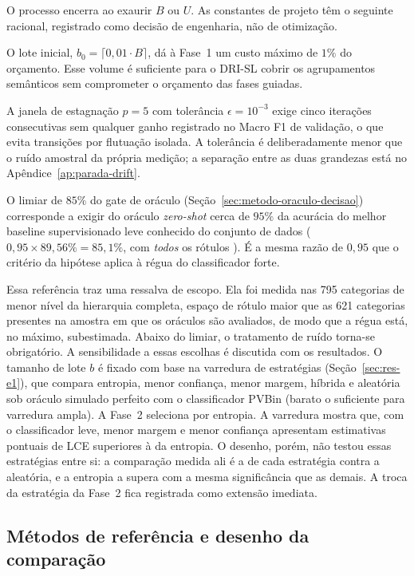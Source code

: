 O processo encerra ao exaurir $B$ ou $U$. As constantes de projeto têm o
seguinte racional, registrado como decisão de engenharia, não de otimização.

O lote inicial, $b_0 = \lceil 0{,}01 \cdot B\rceil$, dá à Fase~1 um custo
máximo de $1\%$ do orçamento. Esse volume é suficiente para o DRI-SL cobrir
os agrupamentos semânticos sem comprometer o orçamento das fases guiadas.

A janela de estagnação $p=5$ com tolerância $\epsilon=10^{-3}$ exige cinco
iterações consecutivas sem qualquer ganho registrado no Macro F1 de validação,
o que evita transições por flutuação isolada. A tolerância é deliberadamente
menor que o ruído amostral da própria medição; a separação entre as duas
grandezas está no Apêndice~\ref{ap:parada-drift}.

O limiar de $85\%$ do gate de oráculo
(Seção~\ref{sec:metodo-oraculo-decisao}) corresponde a exigir do oráculo
\textit{zero-shot} cerca de $95\%$ da acurácia do melhor baseline
supervisionado leve conhecido do conjunto de dados ($0{,}95 \times 89{,}56\% =
85{,}1\%$, com \emph{todos} os rótulos \citep{Daru2024Dissertacao}). É a mesma
razão de $0{,}95$ que o critério da hipótese aplica à régua do classificador
forte.

Essa referência traz uma ressalva de escopo. Ela foi medida nas 795 categorias
de menor nível da hierarquia completa, espaço de rótulo maior que as 621
categorias presentes na amostra em que os oráculos são avaliados, de modo que a
régua está, no máximo, subestimada. Abaixo do limiar, o tratamento de ruído
torna-se obrigatório. A sensibilidade a essas escolhas é discutida com os
resultados. O tamanho de lote $b$ é fixado
com base na varredura de estratégias (Seção~\ref{sec:res-e1}), que compara
entropia, menor confiança, menor margem, híbrida e aleatória sob oráculo
simulado perfeito com o classificador PVBin (barato o suficiente para
varredura ampla). A Fase~2 seleciona por entropia. A varredura mostra que,
com o classificador leve, menor margem e menor confiança apresentam
estimativas pontuais de LCE superiores à da entropia. O desenho, porém, não
testou essas estratégias entre si: a comparação medida ali é a de cada
estratégia contra a aleatória, e a entropia a supera com a mesma
significância que as demais. A troca da estratégia da Fase~2 fica registrada
como extensão imediata.

\subsection{Métodos de referência e desenho da comparação}
\label{sec:metodo-falco-baselines}

